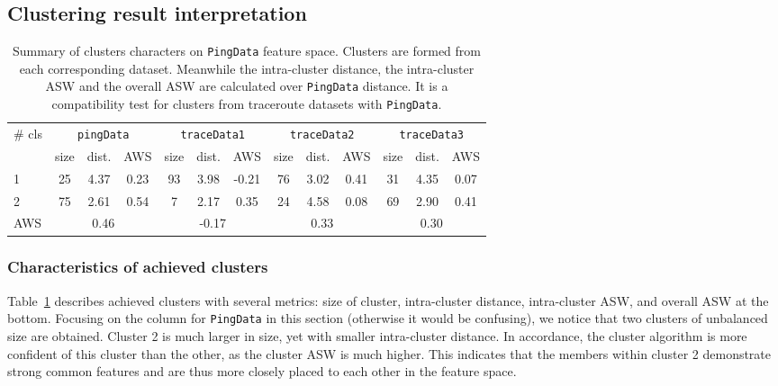 \subsection{Clustering result interpretation}

\begin{table}[!htb]
\centering
\footnotesize
\setlength{\tabcolsep}{0.5em}
\begin{tabular}{l|ccc|ccc|ccc|ccc}
\toprule
\multirow{2}{*}{\# cls} & \multicolumn{3}{c|}{\texttt{pingData}} & \multicolumn{3}{c|}{\texttt{traceData1}} & \multicolumn{3}{c|}{\texttt{traceData2}} & \multicolumn{3}{c}{\texttt{traceData3}}\\
& size & dist. & AWS & size & dist. & AWS & size & dist. & AWS & size& dist. & AWS\\
\midrule
1 & 25 & 4.37 & 0.23 & 93 & 3.98 & -0.21 & 76 & 3.02 & 0.41 & 31 & 4.35 & 0.07\\
2 & 75 & 2.61 & 0.54 & 7  & 2.17 & 0.35  & 24 & 4.58 & 0.08 & 69 & 2.90 & 0.41\\ 
\midrule
AWS &\multicolumn{3}{c|}{0.46} & \multicolumn{3}{c|}{-0.17} & \multicolumn{3}{c|}{0.33} & \multicolumn{3}{c}{0.30}\\
\bottomrule
\end{tabular}
\caption{Summary of clusters characters on \texttt{PingData} feature space. Clusters are formed from each corresponding dataset. Meanwhile the intra-cluster distance, the intra-cluster \ac{ASW} and the overall \ac{ASW} are calculated over \texttt{PingData} distance. It is a compatibility test for clusters from traceroute datasets with \texttt{PingData}.}
\label{tab:summary_cls}
\end{table}

\subsubsection{Characteristics of achieved clusters}
Table~\ref{tab:summary_cls} describes achieved clusters with several metrics: size of cluster, intra-cluster distance, intra-cluster \ac{ASW}, and overall \ac{ASW} at the bottom.
Focusing on the column for \texttt{PingData} in this section (otherwise it would be confusing), we notice that two clusters of unbalanced size are obtained.
Cluster 2 is much larger in size, yet with smaller intra-cluster distance. 
In accordance, the cluster algorithm is more confident of this cluster than the other, as the cluster \ac{ASW} is much higher.
This indicates that the members within cluster 2 demonstrate strong common features and are thus more closely placed to each other in the feature space.

